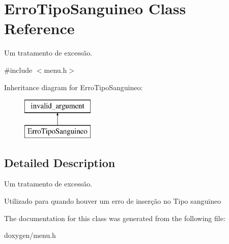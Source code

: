 \hypertarget{class_erro_tipo_sanguineo}{}\section{Erro\+Tipo\+Sanguineo Class Reference}
\label{class_erro_tipo_sanguineo}


Um tratamento de excessão.  




{\ttfamily \#include $<$menu.\+h$>$}

Inheritance diagram for Erro\+Tipo\+Sanguineo\+:\begin{figure}[H]
\begin{center}
\leavevmode
\includegraphics[height=2.000000cm]{class_erro_tipo_sanguineo}
\end{center}
\end{figure}


\subsection{Detailed Description}
Um tratamento de excessão. 

Utilizado para quando houver um erro de inserção no Tipo sanguineo 

The documentation for this class was generated from the following file\+:\begin{DoxyCompactItemize}
\item 
doxygen/menu.\+h\end{DoxyCompactItemize}
